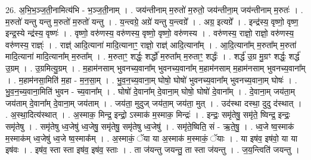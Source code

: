 \documentclass[17pt]{extarticle}
\begin{document}
26. अ॒भि॒भ॒ञ्ज॒ती॒नामित्य॑भि - भ॒ञ्ज॒ती॒नाम् । . जय॑न्तीनाम् म॒रुतो॑ म॒रुतो॒ जय॑न्तीना॒म् जय॑न्तीनाम् म॒रुतः॑ । . म॒रुतो॑ यन्तु यन्तु म॒रुतो॑ म॒रुतो॑ यन्तु । . य॒न्त्वग्रे॒ अग्रे॑ यन्तु य॒न्त्वग्रे᳚ । . अग्र॒ इत्यग्रे᳚ । . इन्द्र॑स्य॒ वृष्णो॒ वृष्ण॒ इन्द्र॒स्ये न्द्र॑स्य॒ वृष्णः॑ । . वृष्णो॒ वरु॑णस्य॒ वरु॑णस्य॒ वृष्णो॒ वृष्णो॒ वरु॑णस्य । . वरु॑णस्य॒ राज्ञो॒ राज्ञो॒ वरु॑णस्य॒ वरु॑णस्य॒ राज्ञ्ः॑ । . राज्ञ्॑ आदि॒त्याना॑ मादि॒त्यानाꣳ॒॒ राज्ञो॒ राज्ञ्॑ आदि॒त्याना᳚म् । . आ॒दि॒त्याना᳚म् म॒रुता᳚म् म॒रुता॑ मादि॒त्याना॑ मादि॒त्याना᳚म् म॒रुता᳚म् । . म॒रुताꣳ॒॒ शर्द्धः॒ शर्द्धो॑ म॒रुता᳚म् म॒रुताꣳ॒॒ शर्द्धः॑ । . शर्द्ध॑ उ॒ग्र मु॒ग्रꣳ शर्द्धः॒ शर्द्ध॑ उ॒ग्रम् । . उ॒ग्रमित्यु॒ग्रम् । . म॒हाम॑नसाम् भुवनच्य॒वाना᳚म् भुवनच्य॒वाना᳚म् म॒हाम॑नसाम् म॒हाम॑नसाम् भुवनच्य॒वाना᳚म् । . म॒हाम॑नसा॒मिति॑ म॒हा - म॒न॒सा॒म् । . भु॒व॒न॒च्य॒वाना॒म् घोषो॒ घोषो॑ भुवनच्य॒वाना᳚म् भुवनच्य॒वाना॒म् घोषः॑ । . भु॒व॒न॒च्य॒वाना॒मिति॑ भुवन - च्य॒वाना᳚म् । . घोषो॑ दे॒वाना᳚म् दे॒वाना॒म् घोषो॒ घोषो॑ दे॒वाना᳚म् । . दे॒वाना॒म् जय॑ता॒म् जय॑ताम् दे॒वाना᳚म् दे॒वाना॒म् जय॑ताम् । . जय॑ता॒ मुदुज् जय॑ता॒म् जय॑ता॒ मुत् । . उद॑स्था दस्था॒ दुदु द॑स्थात् । . अ॒स्था॒दित्य॑स्थात् । . अ॒स्माक॒ मिन्द्र॒ इन्द्रो॒ ऽस्माक॑ म॒स्माक॒ मिन्द्रः॑ । . इन्द्रः॒ समृ॑तेषु॒ समृ॑ते॒ ष्विन्द्र॒ इन्द्रः॒ समृ॑तेषु । . समृ॑तेषु ध्व॒जेषु॑ ध्व॒जेषु॒ समृ॑तेषु॒ समृ॑तेषु ध्व॒जेषु॑ । . समृ॑ते॒ष्विति॒ सं - ऋ॒ते॒षु॒ । . ध्व॒जे ष्व॒स्माक॑ म॒स्माक॑म् ध्व॒जेषु॑ ध्व॒जे ष्व॒स्माक᳚म् । . अ॒स्माकं॒ ॅया या अ॒स्माक॑ म॒स्माकं॒ ॅयाः । . या इष॑व॒ इष॑वो॒ या या इष॑वः । . इष॑व॒ स्ता स्ता इष॑व॒ इष॑व॒ स्ताः । . ता ज॑यन्तु जयन्तु॒ ता स्ता ज॑यन्तु । . ज॒य॒न्त्विति॑ जयन्तु । \newline
\end{document}
